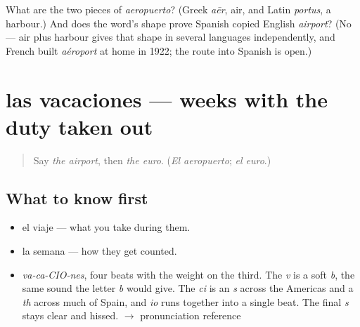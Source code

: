 \begin{tcolorbox}[breakable,colback=teal!4,colframe=teal!35!black,title={Before you move on}]
What are the two pieces of \emph{aeropuerto}? (Greek \emph{aēr}, air, and Latin \emph{portus}, a harbour.) And does the word's shape prove Spanish copied English \emph{airport}? (No — air plus harbour gives that shape in several languages independently, and French built \emph{aéroport} at home in 1922; the route into Spanish is open.)
\end{tcolorbox}
\section[las vacaciones]{las vacaciones — weeks with the duty taken out}

\label{lesson:ES-C392-vacaciones}



\begin{quote}
Say \emph{the airport}, then \emph{the euro}. (\emph{El aeropuerto}; \emph{el euro}.)
\end{quote}

\subsection*{What to know first}
\begin{itemize}
\raggedright
  \item el viaje — what you take during them.
  \item la semana — how they get counted.
\end{itemize}

\begin{sounds}
\begin{itemize}
\raggedright
  \item \emph{va-ca-CIO-nes}, four beats with the weight on the third. The \emph{v} is a soft \emph{b}, the same sound the letter \emph{b} would give. The \emph{ci} is an \emph{s} across the Americas and a \emph{th} across much of Spain, and \emph{io} runs together into a single beat. The final \emph{s} stays clear and hissed. $\to$ pronunciation reference
\end{itemize}
\end{sounds}

